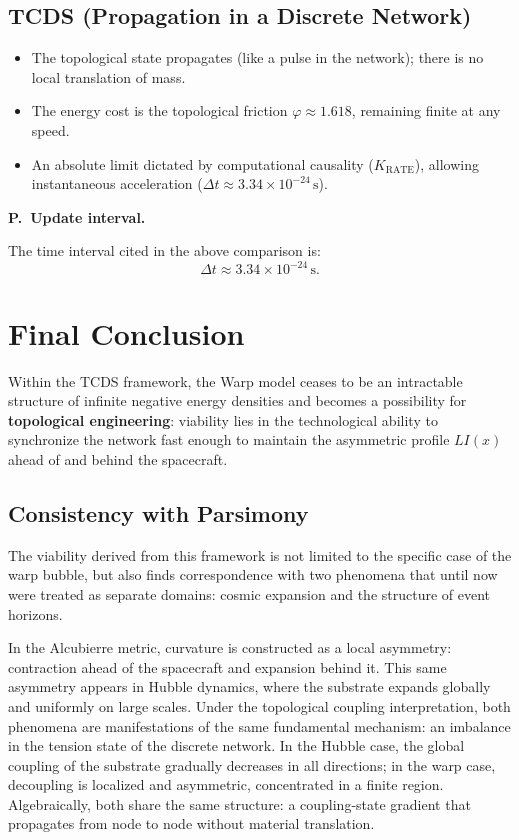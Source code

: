 \documentclass[10pt,a4paper,twocolumn]{article}
\newcounter{parrafoecuacion}
\newcommand{\parrafoecuacion}[2]{%
    \par\smallskip\Needspace{6\baselineskip}%
    \noindent\refstepcounter{parrafoecuacion}\label{#1}%
    \textbf{P\theparrafoecuacion.\ #2.}\enspace
}
\begin{document}
\subsection*{TCDS (Propagation in a Discrete Network)}
\begin{itemize}
    \item The topological state propagates (like a pulse in the network); there is no local translation of mass.
    \item The energy cost is the topological friction $\varphi \approx 1.618$, remaining finite at any speed.
    \item An absolute limit dictated by computational causality ($K_{\text{RATE}}$), allowing instantaneous acceleration ($\Delta t \approx 3.34 \times 10^{-24}\,\mathrm{s}$).
\end{itemize}

\parrafoecuacion{par:intervalo-causal}{Update interval}
The time interval cited in the above comparison is:
\begin{equation}
    \Delta t \approx 3.34 \times 10^{-24}\,\mathrm{s}.
    \label{eq:intervalo-causal}
\end{equation}

\section{Final Conclusion}
Within the TCDS framework, the Warp model ceases to be an intractable structure of infinite negative energy densities and becomes a possibility for \textbf{topological engineering}: viability lies in the technological ability to synchronize the network fast enough to maintain the asymmetric profile $LI(x)$ ahead of and behind the spacecraft.
\subsection{Consistency with Parsimony}
The viability derived from this framework is not limited to the specific case of the warp bubble, but also finds correspondence with two phenomena that until now were treated as separate domains: cosmic expansion and the structure of event horizons.

In the Alcubierre metric, curvature is constructed as a local asymmetry: contraction ahead of the spacecraft and expansion behind it. This same asymmetry appears in Hubble dynamics, where the substrate expands globally and uniformly on large scales. Under the topological coupling interpretation, both phenomena are manifestations of the same fundamental mechanism: an imbalance in the tension state of the discrete network. In the Hubble case, the global coupling of the substrate gradually decreases in all directions; in the warp case, decoupling is localized and asymmetric, concentrated in a finite region. Algebraically, both share the same structure: a coupling-state gradient that propagates from node to node without material translation.
\end{document}
